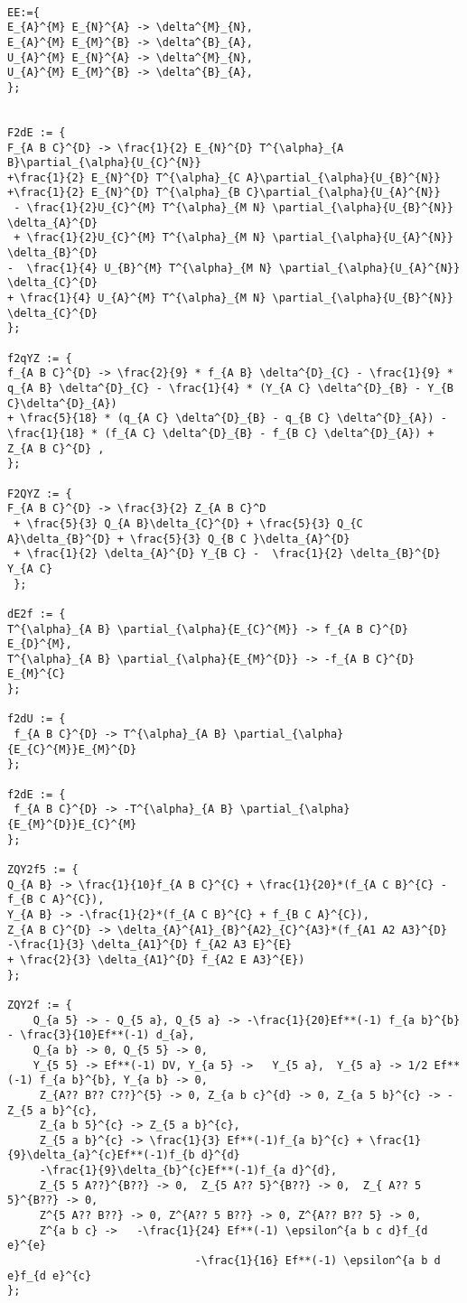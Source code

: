 \documentclass[11pt]{article}
\begin{document}
\\
{\color[named]{Blue}\begin{verbatim}
EE:={
E_{A}^{M} E_{N}^{A} -> \delta^{M}_{N},
E_{A}^{M} E_{M}^{B} -> \delta^{B}_{A},
U_{A}^{M} E_{N}^{A} -> \delta^{M}_{N},
U_{A}^{M} E_{M}^{B} -> \delta^{B}_{A},
};


F2dE := {
F_{A B C}^{D} -> \frac{1}{2} E_{N}^{D} T^{\alpha}_{A B}\partial_{\alpha}{U_{C}^{N}}
+\frac{1}{2} E_{N}^{D} T^{\alpha}_{C A}\partial_{\alpha}{U_{B}^{N}}
+\frac{1}{2} E_{N}^{D} T^{\alpha}_{B C}\partial_{\alpha}{U_{A}^{N}}
 - \frac{1}{2}U_{C}^{M} T^{\alpha}_{M N} \partial_{\alpha}{U_{B}^{N}} \delta_{A}^{D}
 + \frac{1}{2}U_{C}^{M} T^{\alpha}_{M N} \partial_{\alpha}{U_{A}^{N}} \delta_{B}^{D}
-  \frac{1}{4} U_{B}^{M} T^{\alpha}_{M N} \partial_{\alpha}{U_{A}^{N}} \delta_{C}^{D}
+ \frac{1}{4} U_{A}^{M} T^{\alpha}_{M N} \partial_{\alpha}{U_{B}^{N}} \delta_{C}^{D}
};

f2qYZ := {
f_{A B C}^{D} -> \frac{2}{9} * f_{A B} \delta^{D}_{C} - \frac{1}{9} * q_{A B} \delta^{D}_{C} - \frac{1}{4} * (Y_{A C} \delta^{D}_{B} - Y_{B C}\delta^{D}_{A})
+ \frac{5}{18} * (q_{A C} \delta^{D}_{B} - q_{B C} \delta^{D}_{A}) - \frac{1}{18} * (f_{A C} \delta^{D}_{B} - f_{B C} \delta^{D}_{A}) + Z_{A B C}^{D} ,
};

F2QYZ := {
F_{A B C}^{D} -> \frac{3}{2} Z_{A B C}^D  
 + \frac{5}{3} Q_{A B}\delta_{C}^{D} + \frac{5}{3} Q_{C A}\delta_{B}^{D} + \frac{5}{3} Q_{B C }\delta_{A}^{D} 
 + \frac{1}{2} \delta_{A}^{D} Y_{B C} -  \frac{1}{2} \delta_{B}^{D} Y_{A C}
 };

dE2f := {
T^{\alpha}_{A B} \partial_{\alpha}{E_{C}^{M}} -> f_{A B C}^{D} E_{D}^{M},
T^{\alpha}_{A B} \partial_{\alpha}{E_{M}^{D}} -> -f_{A B C}^{D} E_{M}^{C}
};

f2dU := {
 f_{A B C}^{D} -> T^{\alpha}_{A B} \partial_{\alpha}{E_{C}^{M}}E_{M}^{D}
};

f2dE := {
 f_{A B C}^{D} -> -T^{\alpha}_{A B} \partial_{\alpha}{E_{M}^{D}}E_{C}^{M}
};

ZQY2f5 := {
Q_{A B} -> \frac{1}{10}f_{A B C}^{C} + \frac{1}{20}*(f_{A C B}^{C} - f_{B C A}^{C}),
Y_{A B} -> -\frac{1}{2}*(f_{A C B}^{C} + f_{B C A}^{C}),
Z_{A B C}^{D} -> \delta_{A}^{A1}_{B}^{A2}_{C}^{A3}*(f_{A1 A2 A3}^{D}  -\frac{1}{3} \delta_{A1}^{D} f_{A2 A3 E}^{E} 
+ \frac{2}{3} \delta_{A1}^{D} f_{A2 E A3}^{E})
};

ZQY2f := {
    Q_{a 5} -> - Q_{5 a}, Q_{5 a} -> -\frac{1}{20}Ef**(-1) f_{a b}^{b} - \frac{3}{10}Ef**(-1) d_{a},
    Q_{a b} -> 0, Q_{5 5} -> 0,
    Y_{5 5} -> Ef**(-1) DV, Y_{a 5} ->   Y_{5 a},  Y_{5 a} -> 1/2 Ef**(-1) f_{a b}^{b}, Y_{a b} -> 0,
     Z_{A?? B?? C??}^{5} -> 0, Z_{a b c}^{d} -> 0, Z_{a 5 b}^{c} -> - Z_{5 a b}^{c},
     Z_{a b 5}^{c} -> Z_{5 a b}^{c}, 
     Z_{5 a b}^{c} -> \frac{1}{3} Ef**(-1)f_{a b}^{c} + \frac{1}{9}\delta_{a}^{c}Ef**(-1)f_{b d}^{d}
     -\frac{1}{9}\delta_{b}^{c}Ef**(-1)f_{a d}^{d},
     Z_{5 5 A??}^{B??} -> 0,  Z_{5 A?? 5}^{B??} -> 0,  Z_{ A?? 5 5}^{B??} -> 0,  
     Z^{5 A?? B??} -> 0, Z^{A?? 5 B??} -> 0, Z^{A?? B?? 5} -> 0,
     Z^{a b c} ->   -\frac{1}{24} Ef**(-1) \epsilon^{a b c d}f_{d e}^{e}
                             -\frac{1}{16} Ef**(-1) \epsilon^{a b d e}f_{d e}^{c}
};



\end{verbatim}}
\end{document}
